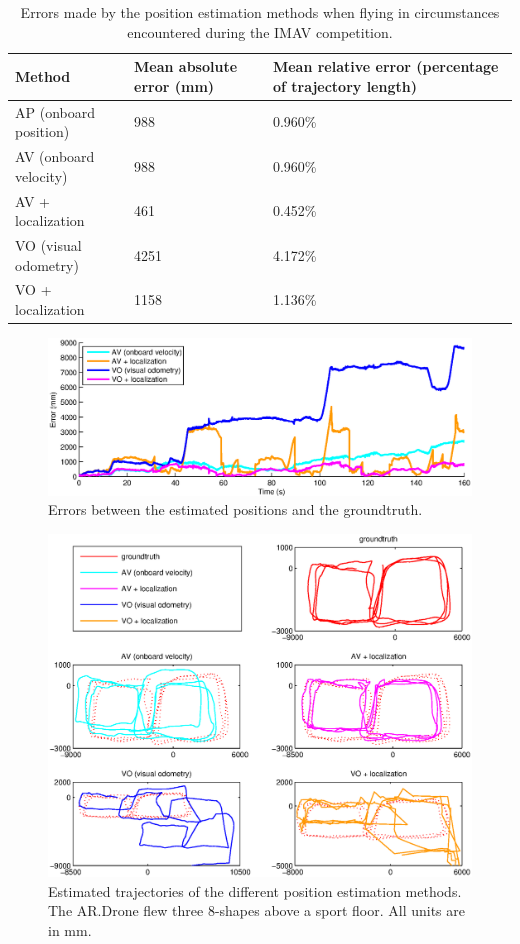 \begin{table}[htb!]
    \centering
    \begin{tabular}
        { | l | l | l | } 
	\hline
	Method & Mean absolute error (\small{mm}) & Mean relative error (percentage of trajectory length) \\
        \hline
	AP (onboard position) & 988 & 0.960\% \\
        AV (onboard velocity) & 988 & 0.960\% \\
	AV + localization & 461 & 0.452\% \\
	VO (visual odometry) & 4251 & 4.172\% \\
	VO + localization & 1158 & 1.136\% \\
	\hline
    \end{tabular}
    \caption{Errors made by the position estimation methods when flying in circumstances encountered during the IMAV competition.}
    \label{tab:res_mapping_imav}
\end{table}

\begin{figure}[htb!]
\centering
\includegraphics[width=\linewidth]{images/exp1-imav-error.eps}
\caption{Errors between the estimated positions and the groundtruth.}
\label{fig:exp1-imav-error}
\end{figure}

\begin{figure}[htb!]
\centering
\includegraphics[width=\linewidth,trim=2cm 1.5cm 2cm 2cm]{images/exp1-imav-path.eps}
\caption{Estimated trajectories of the different position estimation methods. The AR.Drone flew three 8-shapes above a sport floor. All units are in \small{mm}.}
\label{fig:exp1-imav-path}
\end{figure}

